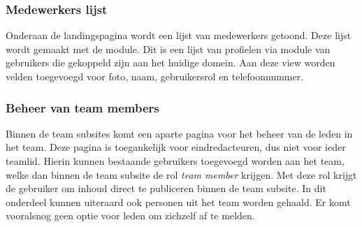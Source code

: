 \subsubsection{Medewerkers lijst}

Onderaan de landingspagina wordt een lijst van medewerkers getoond. Deze lijst wordt gemaakt met de  module. Dit is een lijst van profielen via  module van gebruikers die gekoppeld zijn aan het huidige domein. Aan deze view worden velden toegevoegd voor foto, naam, gebruikersrol en telefoonnummer.

\subsubsection{Beheer van team members}\label{teammemberbeheer}

Binnen de team subsites komt een aparte pagina voor het beheer van de leden in het team. Deze pagina is toegankelijk voor eindredacteuren, dus niet voor ieder teamlid. Hierin kunnen bestaande gebruikers toegevoegd worden aan het team, welke dan binnen de team subsite de rol \emph{team member} krijgen. Met deze rol krijgt de gebruiker om inhoud direct te publiceren binnen de team subsite. In dit onderdeel kunnen uiteraard ook personen uit het team worden gehaald. Er komt vooralsnog geen optie voor leden om zichzelf af te melden.

